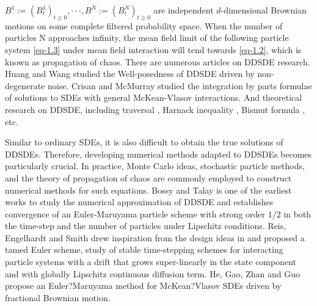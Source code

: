\documentclass[12pt]{article}
\numberwithin{equation}{section}
\begin{document}
	$B^1:=(B^1_t)_{t\geq0}, \cdot\cdot\cdot, B^N:=(B^N_t)_{t\geq0}$ are independent $d$-dimensional Brownian motions on some complete filtered probability space. When the number of particles N approaches infinity, the mean field limit of the following particle system \eqref{eq-1.3} under mean field interaction will tend towards \eqref{eq-1.2}, which is known as propagation of chaos. There are numerous articles on DDSDE research. Huang and  Wang \cite{3} studied the Well-posedness of DDSDE driven by non-degenerate noise. Crisan and  McMurray \cite{7} studied the integration by parts formulae of solutions to SDEs with general McKean-Vlasov interactions. And theoretical research on DDSDE, including traversal \cite{4}, Harnack inequality \cite{5}, Bismut formula \cite{6}, etc.
	
	Similar to ordinary SDEs, it is also difficult to obtain the true solutions of DDSDEs. Therefore, developing numerical methods adapted to DDSDEs becomes particularly crucial. In practice, Monte Carlo ideas, stochastic particle methods, and the theory of propagation of chaos are commonly employed to construct numerical methods for such equations. Bossy and Talay \cite{8} is one of the earliest works to study the numerical approximation of DDSDE and establishes convergence of an Euler-Maruyama particle scheme with strong order
	$1/2$ in both the time-step and the number of particles under Lipschitz conditions. Reis, Engelhardt and Smith \cite{15} drew inspiration from the design ideas in \cite{23,36} and proposed a tamed Euler scheme, study of stable time-stepping schemes for interacting particle systems with a drift that grows super-linearly in the state component and with globally Lipschitz continuous diffusion term.
	He, Gao, Zhan and Guo \cite{JSW} propose an Euler?Maruyama
	method for McKean?Vlasov SDEs driven by fractional Brownian motion.
	
\end{document}
